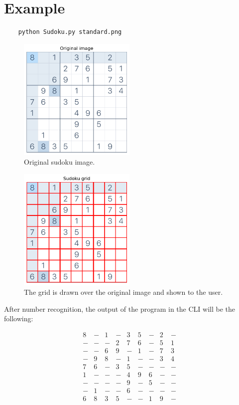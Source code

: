 \documentclass[12pt]{article}
\begin{document}
\section{Example}
\begin{verbatim}
    python Sudoku.py standard.png
\end{verbatim}
\begin{figure}[h!]
    \centering
    \includegraphics[width=0.5\textwidth]{original.png}
    \caption{Original sudoku image.}
\end{figure}
\begin{figure}[h!]
    \centering
    \includegraphics[width=0.5\textwidth]{grid.png}
    \caption{The grid is drawn over the original image and shown to the user.}
\end{figure}
\newpage
After number recognition, the output of the program in the CLI will be the following:

\begin{equation*}
    \begin{array}{ccccccccc}
    8 & - & 1 & - & 3 & 5 & - & 2 & - \\
    - & - & - & 2 & 7 & 6 & - & 5 & 1 \\
    - & - & 6 & 9 & - & 1 & - & 7 & 3 \\
    - & 9 & 8 & - & 1 & - & - & 3 & 4 \\
    7 & 6 & - & 3 & 5 & - & - & - & - \\
    1 & - & - & - & 4 & 9 & 6 & - & - \\
    - & - & - & - & 9 & - & 5 & - & - \\
    - & 1 & - & - & 6 & - & - & - & - \\
    6 & 8 & 3 & 5 & - & - & 1 & 9 & - \\
    \end{array}
\end{equation*}
\end{document}
